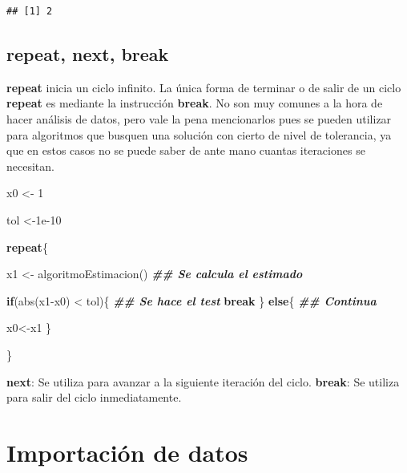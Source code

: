 \documentclass[
  12pt,
]{book}
\newenvironment{Shaded}{\begin{snugshade}}{\end{snugshade}}
\newcommand{\ControlFlowTok}[1]{\textcolor[rgb]{0.13,0.29,0.53}{\textbf{#1}}}
\newcommand{\DecValTok}[1]{\textcolor[rgb]{0.00,0.00,0.81}{#1}}
\newcommand{\DocumentationTok}[1]{\textcolor[rgb]{0.56,0.35,0.01}{\textbf{\textit{#1}}}}
\newcommand{\FloatTok}[1]{\textcolor[rgb]{0.00,0.00,0.81}{#1}}
\newcommand{\FunctionTok}[1]{\textcolor[rgb]{0.00,0.00,0.00}{#1}}
\newcommand{\NormalTok}[1]{#1}
\newcommand{\OtherTok}[1]{\textcolor[rgb]{0.56,0.35,0.01}{#1}}
\newcommand{\SpecialCharTok}[1]{\textcolor[rgb]{0.00,0.00,0.00}{#1}}
\begin{document}
\begin{verbatim}
## [1] 2
\end{verbatim}

\hypertarget{repeat-next-break}{%
\section{\texorpdfstring{\textbf{repeat, next, break}}{repeat, next, break}}\label{repeat-next-break}}

\textbf{repeat} inicia un ciclo infinito. La única forma de terminar o de salir de un ciclo \textbf{repeat} es mediante la instrucción \textbf{break}. No son muy comunes a la hora de hacer análisis de datos, pero vale la pena mencionarlos pues se pueden utilizar para algoritmos que busquen una solución con cierto de nivel de tolerancia, ya que en estos casos no se puede saber de ante mano cuantas iteraciones se necesitan.

\begin{Shaded}
\begin{Highlighting}[]
\NormalTok{x0 }\OtherTok{\textless{}{-}} \DecValTok{1}

\NormalTok{tol }\OtherTok{\textless{}{-}}\FloatTok{1e{-}10}

\ControlFlowTok{repeat}\NormalTok{\{}
  
  
\NormalTok{  x1 }\OtherTok{\textless{}{-}} \FunctionTok{algoritmoEstimacion}\NormalTok{() }\DocumentationTok{\#\# Se calcula el estimado}
  
  \ControlFlowTok{if}\NormalTok{(}\FunctionTok{abs}\NormalTok{(x1}\SpecialCharTok{{-}}\NormalTok{x0) }\SpecialCharTok{\textless{}}\NormalTok{ tol)\{ }\DocumentationTok{\#\# Se hace el test}
    \ControlFlowTok{break}
\NormalTok{  \} }\ControlFlowTok{else}\NormalTok{\{   }\DocumentationTok{\#\# Continua}
    
\NormalTok{  x0}\OtherTok{\textless{}{-}}\NormalTok{x1}
\NormalTok{  \}}
  
\NormalTok{\}}
\end{Highlighting}
\end{Shaded}

\textbf{next}: Se utiliza para avanzar a la siguiente iteración del ciclo.
\textbf{break}: Se utiliza para salir del ciclo inmediatamente.

\hypertarget{importaciuxf3n-de-datos}{%
\chapter{\texorpdfstring{\textbf{Importación de datos}}{Importación de datos}}\label{importaciuxf3n-de-datos}}
\end{document}
